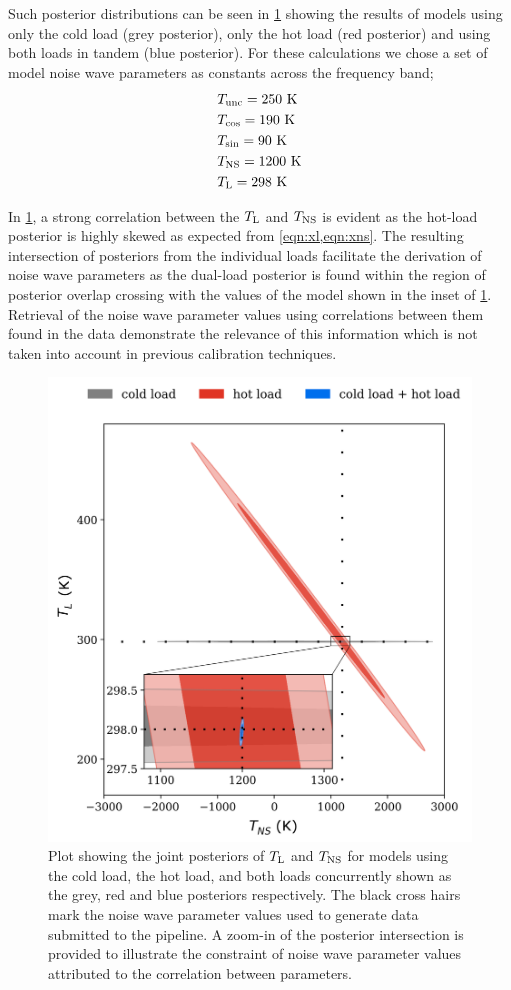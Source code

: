 Such posterior distributions can be seen in \cref{fig:goodplot} showing the results of models using only the cold load (grey posterior), only the hot load (red posterior) and using both loads in tandem (blue posterior). For these calculations we chose a set of model noise wave parameters as constants across the frequency band;
\begin{align*}
    & T_{\mathrm{unc}} = 250 \ \mathrm{K} \\
    & T_{\mathrm{cos}} = 190 \ \mathrm{K} \\
    & T_{\mathrm{sin}} = 90 \ \mathrm{K} \\
    & T_{\mathrm{NS}} = 1200 \ \mathrm{K} \\
    & T_{\mathrm{L}} = 298 \ \mathrm{K}
\end{align*}

In \cref{fig:goodplot}, a strong correlation between the $T_{\mathrm{L}}$ and $T_{\mathrm{NS}}$ is evident as the hot-load posterior is highly skewed as expected from \cref{eqn:xl,eqn:xns}. The resulting intersection of posteriors from the individual loads facilitate the derivation of noise wave parameters as the dual-load posterior is found within the region of posterior overlap crossing with the values of the model shown in the inset of \cref{fig:goodplot}. Retrieval of the noise wave parameter values using correlations between them found in the data demonstrate the relevance of this information which is not taken into account in previous calibration techniques.
\begin{figure}
    \centering
    \includegraphics[width=.5\columnwidth]{goodplot}
    \caption{Plot showing the joint posteriors of $T_{\mathrm{L}}$ and $T_{\mathrm{NS}}$ for models using the cold load, the hot load, and both loads concurrently shown as the grey, red and blue posteriors respectively. The black cross hairs mark the noise wave parameter values used to generate data submitted to the pipeline. A zoom-in of the posterior intersection is provided to illustrate the constraint of noise wave parameter values attributed to the correlation between parameters. \label{fig:goodplot}}
\end{figure}


